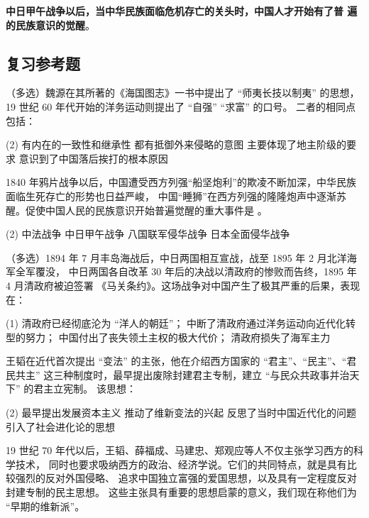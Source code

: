 \documentclass[10pt, UTF8]{book} %
\begin{document}
\textbf{中日甲午战争以后，当中华民族面临危机存亡的关头时，中国人才开始有了普
遍的民族意识的觉醒}。

\subsection{复习参考题}

\begin{example}
    （多选）魏源在其所著的《海国图志》一书中提出了 “师夷长技以制夷” 的思想，
    19 世纪 60 年代开始的洋务运动则提出了 “自强” “求富” 的口号。
    二者的相同点包括：
    \begin{tasks}[label={\Alph*. }](2)
        \task 有内在的一致性和继承性
        \task 都有抵御外来侵略的意图
        \task 主要体现了地主阶级的要求
        \task 意识到了中国落后挨打的根本原因
    \end{tasks}
\end{example}

\begin{example}
    1840 年鸦片战争以后，中国遭受西方列强“船坚炮利”的欺凌不断加深，中华民族面临生死存亡的形势也日益严峻，
    中国“睡狮”在西方列强的隆隆炮声中逐渐苏醒。促使中国人民的民族意识开始普遍觉醒的重大事件是 \underline{\qquad \qquad \qquad}。
    \begin{tasks}[label={\Alph*. }](2)
        \task 中法战争
        \task 中日甲午战争
        \task 八国联军侵华战争
        \task 日本全面侵华战争
    \end{tasks}
\end{example}

\begin{example}
    （多选）1894 年 7 月丰岛海战后，中日两国相互宣战，战至 1895 年 2 月北洋海军全军覆没，
    中日两国各自改革 30 年后的决战以清政府的惨败而告终，1895 年 4 月清政府被迫签署
    《马关条约》。这场战争对中国产生了极其严重的后果，表现在：
    \begin{tasks}[label={\Alph*. }](1)
        \task 清政府已经彻底沦为 “洋人的朝廷”；
        \task 中断了清政府通过洋务运动向近代化转型的努力；
        \task 中国付出了丧失领土主权的极大代价；
        \task 清政府损失了海军主力
    \end{tasks}
\end{example}

\begin{example}
    王韬在近代首次提出 “变法” 的主张，他在介绍西方国家的 “君主”、“民主”、“君民共主”
    这三种制度时，最早提出废除封建君主专制，建立 “与民众共政事并治天下” 的君主立宪制。
    该思想：
    \begin{tasks}[label={\Alph*. }](2)
        \task 最早提出发展资本主义
        \task 推动了维新变法的兴起
        \task 反思了当时中国近代化的问题
        \task 引入了社会进化论的思想
    \end{tasks}
    \begin{sol}
        19 世纪 70 年代以后，王韬、薛福成、马建忠、郑观应等人不仅主张学习西方的科学技术，
        同时也要求吸纳西方的政治、经济学说。它们的共同特点，就是具有比较强烈的反对外国侵略、
        追求中国独立富强的爱国思想，以及具有一定程度反对封建专制的民主思想。
        这些主张具有重要的思想启蒙的意义，我们现在称他们为 “早期的维新派”。
    \end{sol}
\end{example}
\end{document}
